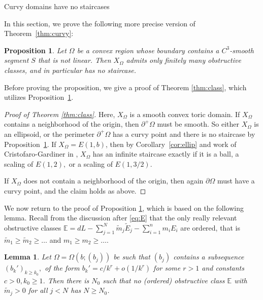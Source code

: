\documentclass[11pt, reqno]{amsart}
\makeatletter
\def\subsection{\@startsection{subsection}{2}%
  \z@{.75\linespacing\@plus.7\linespacing}{-.5em}%
  {\normalfont\large\bfseries}}
\newtheorem{lemma}[thm]{Lemma}
\newtheorem{prop}[thm]{Proposition}
\theoremstyle{remark}
\numberwithin{equation}{subsection}
\numberwithin{figure}{section}
\theoremstyle{customremark}
\newcommand{\TE}{{\widetilde E}}
\newcommand{\Tm}{{\widetilde m}}
\newcommand{\bE}{{\mathbb E}}
\newcommand{\Om}{{\Omega}}
\newcommand{\p}{{\partial}}
\makeatother
\begin{document}
 \subsection{Curvy domains have no staircases}\label{ss:curvy}

In this section, we prove the following more precise version of Theorem~\ref{thm:curvy}: 

 
\begin{prop} \label{prop:round} Let $\Om$ be a convex region  whose boundary contains a $C^3$-smooth segment $S$ that is not linear.
Then $X_\Om$ admits only finitely many obstructive classes, and in particular has no staircase.
\end{prop}


Before proving the proposition, we give a proof of Theorem \ref{thm:class}, which utilizes Proposition~\ref{prop:round}.

\begin{proof}[Proof of Theorem \ref{thm:class}]
    Here, $X_\Omega$ is a smooth convex toric domain. If $X_\Omega$ contains a neighborhood of the origin, then $\p^+\Omega$ must be smooth.  So either $X_\Omega$ is an ellipsoid, or the perimeter $\p^+\Omega$ 
    has a curvy point and there is no staircase by Proposition~\ref{prop:round}. If $X_\Omega=E(1,b)$, then 
    by Corollary~\ref{cor:ellip} and work of Cristofaro-Gardiner in \cite{CG2}, $X_\Omega$ has an infinite staircase exactly if it is a ball, a scaling of $E(1,2),$ or a scaling of $E(1,3/2).$
    
    If $X_\Omega$ does not contain a neighborhood of the origin, then again $\p\Omega$ must have a curvy point, and the claim holds as above.
\end{proof}

We now return to the proof of Proposition \ref{prop:round}, which
is based on the following lemma.   Recall from the discussion after \eqref{eq:E} that the only really relevant obstructive  classes $\bE = dL - \sum_{j=1}^N \Tm_j \TE_j - \sum_{i=1}^n m_i E_i$ are ordered, that is  $\Tm_1\ge \Tm_2\ge \dots$ and $m_1\ge m_2\ge\dots$.  


\begin{lemma}\label{lem:round}   Let $\Om = \Om(b;(b_j))$ be such that $(b_j)$ contains a subsequence $(b_k')_{k\ge k_0},$ 
of the form $b_k' = c/k^r + o(1/k^r)$ for some $r>1$ and constants $c>0, k_0 \ge 1$. Then there is $N_0$ such that no  (ordered) obstructive class $\bE$
with $\Tm_j>0$ for all $j<N$  has $N\ge N_0$. 
\end{lemma}
\end{document}

